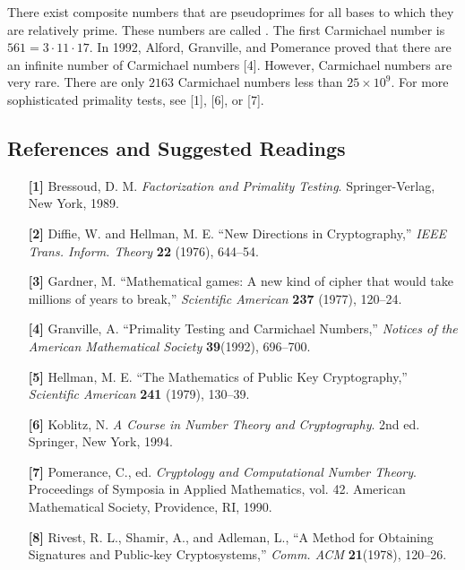 {\begin{enumerate}
 
There exist composite numbers that are pseudoprimes for all bases to
which they are relatively prime.  These numbers are called . The first Carmichael
number is $561 = 3 \cdot 11 \cdot 17$.  In 1992, Alford, Granville, and
Pomerance proved that there are an infinite number of Carmichael
numbers [4].  However, Carmichael numbers are very rare.  There are
only $2163$ Carmichael numbers less than $25 \times 10^9$. For more
sophisticated primality tests, see [1], [6], or [7].  
 
 
\end{enumerate}
}
 
 
\subsection*{References and Suggested Readings}
 
{\small
\begin{itemize}
 
\item[\textbf{[1]}]
Bressoud, D. M. \textit{Factorization and Primality Testing}.
Springer-Verlag, New York, 1989. 
 
\item[\textbf{[2]}]
Diffie, W. and Hellman, M. E. ``New Directions in
Cryptography,'' \textit{IEEE Trans. Inform. Theory} \textbf{
22} (1976), 644--54.
 
\item[\textbf{[3]}] %
Gardner, M. ``Mathematical games: A new kind of cipher that would take millions
of years to break,'' \textit{Scientific American} \textbf{
237} (1977), 120--24.
 
\item[\textbf{[4]}]%
Granville, A. ``Primality Testing and Carmichael Numbers,'' {\it
Notices of the American Mathematical Society} \textbf{39}(1992),
696--700. 
 
\item[\textbf{[5]}]
Hellman, M. E. ``The Mathematics of Public Key
Cryptography,''  \textit{Scientific American} \textbf{241}
(1979), 130--39.
 

\item[\textbf{[6]}] %
Koblitz, N. \textit{A Course in Number Theory and Cryptography}. 2nd ed.
Springer, New York, 1994.  
 
 
\item[\textbf{[7]}]
Pomerance, C., ed. \textit{Cryptology and Computational Number
Theory}. Proceedings of Symposia in Applied Mathematics,
vol. 42. American Mathematical Society, Providence, RI,
1990.
 
\item[\textbf{[8]}]
Rivest, R. L., Shamir, A., and Adleman, L., ``A Method for
Obtaining Signatures and Public-key Cryptosystems,'' {\it
Comm. ACM} \textbf{21}(1978), 120--26.
 
\end{itemize}
}
 
\sagesection

 
